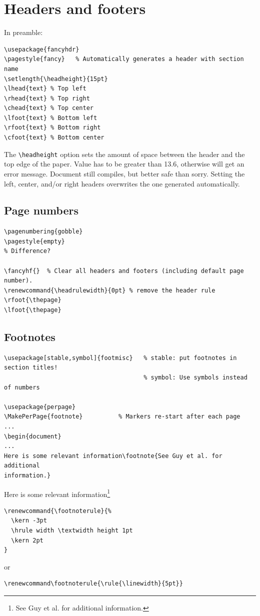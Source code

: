\documentclass{article}
\begin{document}
\section{Headers and footers}\label{headfoot}
In preamble:
\begin{lstlisting}
\usepackage{fancyhdr}
\pagestyle{fancy}   % Automatically generates a header with section name
\setlength{\headheight}{15pt}
\lhead{text} % Top left
\rhead{text} % Top right
\chead{text} % Top center
\lfoot{text} % Bottom left
\rfoot{text} % Bottom right
\cfoot{text} % Bottom center
\end{lstlisting}

The \verb|\headheight| option sets the amount of space between the
header and the top edge of the paper. Value has to be greater than
13.6, otherwise will get an error message. Document still
compiles, but better safe than sorry. Setting the left, center, and/or
right headers overwrites the one generated automatically.

\subsection{Page numbers}
\begin{lstlisting}
\pagenumbering{gobble}
\pagestyle{empty}
% Difference?

\fancyhf{}  % Clear all headers and footers (including default page number).
\renewcommand{\headrulewidth}{0pt} % remove the header rule
\rfoot{\thepage}
\lfoot{\thepage}
\end{lstlisting}

\subsection{Footnotes}
\begin{lstlisting}
\usepackage[stable,symbol]{footmisc}   % stable: put footnotes in section titles!
                                       % symbol: Use symbols instead of numbers

\usepackage{perpage}
\MakePerPage{footnote}          % Markers re-start after each page
...
\begin{document}
...
Here is some relevant information\footnote{See Guy et al. for additional
information.}
\end{lstlisting}
Here is some relevant information\footnote{See Guy et al. for additional
information.}

\begin{lstlisting}
\renewcommand{\footnoterule}{%
  \kern -3pt
  \hrule width \textwidth height 1pt
  \kern 2pt
}
\end{lstlisting}
or
\begin{lstlisting}
\renewcommand\footnoterule{\rule{\linewidth}{5pt}}
\end{lstlisting}
\end{document}
